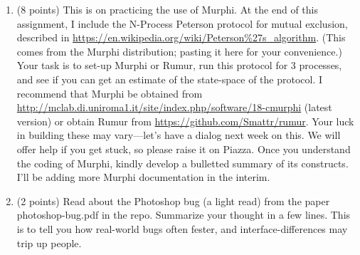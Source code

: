 \documentclass[11pt]{article}
\begin{document}
\begin{enumerate}
  
\item (8 points)
  This is on practicing the use of Murphi.
  At the end of this assignment, I include the N-Process Peterson protocol
  for mutual exclusion, described in
  \url{https://en.wikipedia.org/wiki/Peterson\%27s_algorithm}.
  (This comes from the Murphi distribution; pasting it here for your
  convenience.)
  Your task is to set-up Murphi or Rumur, run this protocol for 3 processes, and
  see if you can get an estimate of the state-space of the protocol.
  I recommend that Murphi be obtained from
  \url{http://mclab.di.uniroma1.it/site/index.php/software/18-cmurphi} (latest version)
  or obtain Rumur from
  \url{https://github.com/Smattr/rumur}.
  Your luck in building these may vary---let's have a dialog next week on this.
  We will offer help if you get stuck, so please raise it on Piazza.
  Once you understand the coding of Murphi, kindly develop a bulletted summary of its
  constructs.
  I'll be adding more Murphi documentation in the interim.


\begin{minipage}{\minpagw}
\end{minipage}
\item (2 points) Read about the Photoshop bug (a light read) from the paper photoshop-bug.pdf in the repo.
  Summarize your thought in a few lines. This is to tell you how real-world bugs often fester, and
  interface-differences may trip up people.
  

\end{enumerate}
\end{document}
